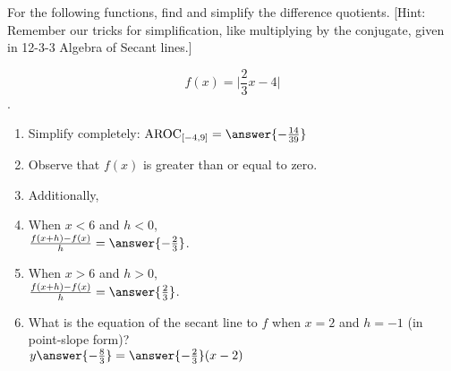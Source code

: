 \documentclass{ximera}
\author{Elizabeth Campolongo}
\begin{document}
\begin{exercise}

For the following functions, 
find and simplify the difference quotients. [Hint: Remember our tricks for simplification, like multiplying by the conjugate, given in 12-3-3 Algebra of Secant lines.]

$$f(x)= \Big|\frac{2}{3}x-4\Big|$$.

\begin{enumerate}

\item Simplify completely:
$\av_{[-4,9]} = \answer{-\frac{14}{39}}$
\item Observe that $f(x)$ is  greater than or equal to zero.
\item Additionally,
\begin{multipleChoice}
\end{multipleChoice}

\item When $x<6$ and $h<0$,\\
$\frac{f(x+h)-f(x)}{h} = \answer{-\frac{2}{3}}$.  

\item When $x>6$ and $h>0$,\\
$\frac{f(x+h)-f(x)}{h} = \answer{\frac{2}{3}}$.  

\item What is the equation of the secant line to $f$ when $x = 2$ and $h=-1$ (in point-slope form)?\\
$y\answer{-\frac{8}{3}}= \answer{-\frac{2}{3}}(x-2)$

\end{enumerate}
\end{exercise}
\end{document}
